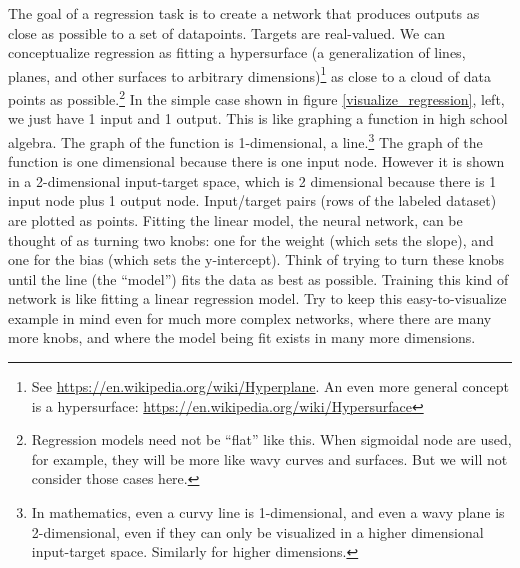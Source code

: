 The goal of a regression task is to create a network that produces outputs as close as possible to a set of datapoints. Targets are real-valued. We can conceptualize regression as fitting a hypersurface (a generalization of lines, planes, and other surfaces to arbitrary dimensions)\footnote{See \url{https://en.wikipedia.org/wiki/Hyperplane}. An even more general concept is a hypersurface: \url{https://en.wikipedia.org/wiki/Hypersurface}} as close to a cloud of data points as possible.\footnote{Regression models need not be ``flat'' like this. When sigmoidal node are used, for example, they will be more like wavy curves and surfaces. But we will not consider those cases here.} In the simple case shown in figure \ref{visualize_regression}, left,  we just have 1 input and 1 output. This is like graphing a function in high school algebra. The graph of the function is 1-dimensional, \ie a line.\footnote{In mathematics, even a curvy line is 1-dimensional, and even a wavy plane is 2-dimensional, even if they can only be visualized in a higher dimensional input-target space. Similarly for higher dimensions.} The graph of the function is one dimensional because there is one input node. However it is shown in a 2-dimensional  input-target space, which is 2 dimensional because there is 1 input node plus 1 output  node. Input/target pairs (\ie rows of the labeled dataset) are plotted as points. Fitting the linear model, the neural network, can be thought of as turning two knobs: one for the weight (which sets the slope), and one for the bias (which sets the y-intercept). Think of trying to turn these knobs until the line (the ``model'') fits the data as best as possible. Training this kind of network is like fitting a linear regression model. Try to keep this easy-to-visualize example in mind even for much more complex networks, where there are many more knobs, and where the model being fit exists in many more dimensions.

